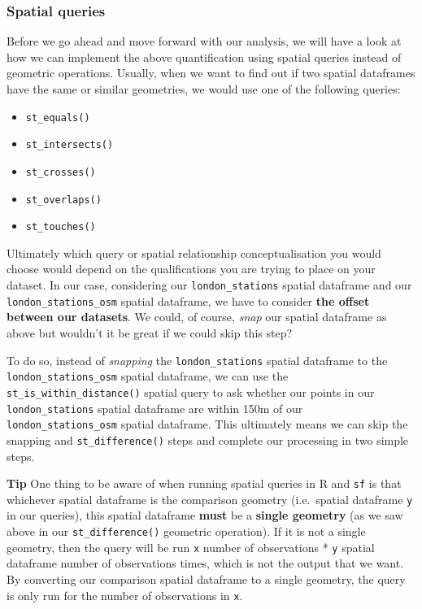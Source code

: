 \documentclass[
]{book}
\providecommand{\tightlist}{%
  \setlength{\itemsep}{0pt}\setlength{\parskip}{0pt}}
\begin{document}
\hypertarget{spatial-queries}{%
\subsubsection{Spatial queries}\label{spatial-queries}}

Before we go ahead and move forward with our analysis, we will have a look at how we can implement the above quantification using spatial queries instead of geometric operations. Usually, when we want to find out if two spatial dataframes have the same or similar geometries, we would use one of the following queries:

\begin{itemize}
\tightlist
\item
  \texttt{st\_equals()}
\item
  \texttt{st\_intersects()}
\item
  \texttt{st\_crosses()}
\item
  \texttt{st\_overlaps()}
\item
  \texttt{st\_touches()}
\end{itemize}

Ultimately which query or spatial relationship conceptualisation you would choose would depend on the qualifications you are trying to place on your dataset. In our case, considering our \texttt{london\_stations} spatial dataframe and our \texttt{london\_stations\_osm} spatial dataframe, we have to consider \textbf{the offset between our datasets}. We could, of course, \emph{snap} our spatial dataframe as above but wouldn't it be great if we could skip this step?

To do so, instead of \emph{snapping} the \texttt{london\_stations} spatial dataframe to the \texttt{london\_stations\_osm} spatial dataframe, we can use the \texttt{st\_is\_within\_distance()} spatial query to ask whether our points in our \texttt{london\_stations} spatial dataframe are within 150m of our \texttt{london\_stations\_osm} spatial dataframe. This ultimately means we can skip the snapping and \texttt{st\_difference()} steps and complete our processing in two simple steps.

\textbf{Tip}
One thing to be aware of when running spatial queries in R and \texttt{sf} is that whichever spatial dataframe is the comparison geometry (i.e.~spatial dataframe \texttt{y} in our queries), this spatial dataframe \textbf{must} be a \textbf{single geometry} (as we saw above in our \texttt{st\_difference()} geometric operation). If it is not a single geometry, then the query will be run \texttt{x} number of observations * \texttt{y} spatial dataframe number of observations times, which is not the output that we want. By converting our comparison spatial dataframe to a single geometry, the query is only run for the number of observations in \texttt{x}.
\end{document}
